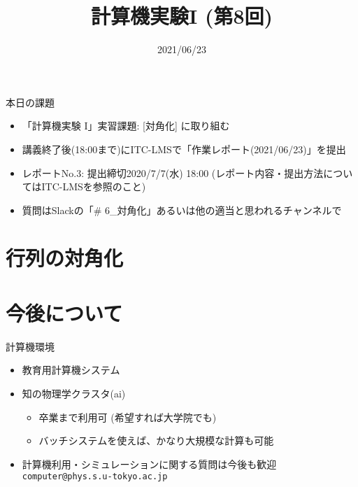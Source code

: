 \documentclass[10pt,dvipdfmx]{beamer}
\title{計算機実験I (第8回)}
\date{2021/06/23}
\begin{document}
\begin{frame}
  \titlepage
  \tableofcontents
\end{frame}

\begin{frame}[t]{本日の課題}
  \begin{itemize}
  \item 「計算機実験 I」実習課題: [対角化] に取り組む
  \item 講義終了後(18:00まで)にITC-LMSで「作業レポート(2021/06/23)」を提出
  \item レポートNo.3: 提出締切2020/7/7(水) 18:00 (レポート内容・提出方法についてはITC-LMSを参照のこと)
  \item 質問はSlackの「\# 6\_対角化」あるいは他の適当と思われるチャンネルで
  \end{itemize}
\end{frame}

\section{行列の対角化}





%
%

\section{今後について}

\begin{frame}[t,fragile]{計算機環境}
  \begin{itemize}
  \item 教育用計算機システム
  \item 知の物理学クラスタ(ai)
    \begin{itemize}
    \item 卒業まで利用可 (希望すれば大学院でも)
    \item バッチシステムを使えば、かなり大規模な計算も可能
    \end{itemize}
  \item 計算機利用・シミュレーションに関する質問は今後も歓迎 {\tt computer@phys.s.u-tokyo.ac.jp}
  \end{itemize}
\end{frame}
\end{document}
